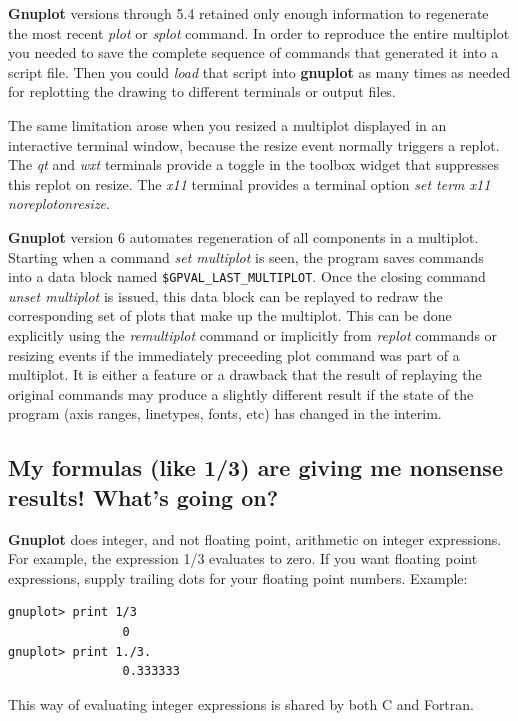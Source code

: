 \documentclass[letter,11pt]{article}
\newcommand{\gnuplot}{\textbf{gnuplot }}
\newcommand{\Gnuplot}{\textbf{Gnuplot }}
\begin{document}
{\Gnuplot versions through 5.4 retained only enough information to regenerate
the most recent {\em plot} or {\em splot} command.
In order to reproduce the entire multiplot you needed to save the complete
sequence of commands that generated it into a script file.
Then you could {\em load} that script into \gnuplot as many times as needed
for replotting the drawing to different terminals or output files.

The same limitation arose when you resized a multiplot displayed in an interactive
terminal window, because the resize event normally triggers a replot.
The {\em qt} and {\em wxt} terminals provide a toggle in the toolbox widget
that suppresses this replot on resize.  The {\em x11} terminal provides a 
terminal option {\em set term x11 noreplotonresize}.

\Gnuplot version 6 automates regeneration of all components in a multiplot.
Starting when a command \textit{set multiplot} is seen, the program saves
commands into a data block named \verb|$GPVAL_LAST_MULTIPLOT|.
Once the closing command \textit{unset multiplot} is issued, this data block
can be replayed to redraw the corresponding set of plots that make up the multiplot.
This can be done explicitly using the \textit{remultiplot} command or implicitly
from \textit{replot} commands or resizing events if the immediately preceeding plot
command was part of a multiplot.  It is either a feature or a drawback that the
result of replaying the original commands may produce a slightly different result
if the state of the program (axis ranges, linetypes, fonts, etc) has changed in
the interim.

\subsection{My formulas (like 1/3) are giving me nonsense results! What's going on?}

\Gnuplot{} does integer, and not floating point, arithmetic on
integer expressions. For example, the expression 1/3 evaluates
to zero. If you want floating point expressions, supply
trailing dots for your floating point numbers. Example:


\small
\begin{verbatim}
gnuplot> print 1/3
                0
gnuplot> print 1./3.
                0.333333
\end{verbatim}
\normalsize

This way of evaluating integer expressions is shared by both C and Fortran.


}
\end{document}
